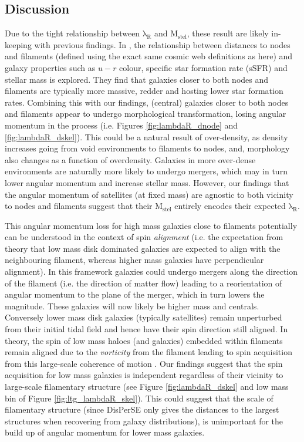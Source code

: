 \subsection{Discussion}
Due to the tight relationship between $\mathrm{\lambda_R}$ and $\mathrm{M_{stel}}$, these result are likely in-keeping with previous findings. In \citet{kraljic2018}, the relationship between distances to nodes and filaments (defined using the exact same cosmic web definitions as here) and galaxy properties such as $u - r$ colour, specific star formation rate (sSFR) and stellar mass is explored. They find that galaxies closer to both nodes and filaments are typically more massive, redder and hosting lower star formation rates. Combining this with our findings, (central) galaxies closer to both nodes and filaments appear to undergo morphological transformation, losing angular momentum in the process (i.e. Figures \ref{fig:lambdaR_dnode} and \ref{fig:lambdaR_dskel}). This could be a natural result of over-density, as density increases going from void environments to filaments to nodes, and, morphology also changes as a function of overdensity. Galaxies in more over-dense environments are naturally more likely to undergo mergers, which may in turn lower angular momentum and increase stellar mass. However, our findings that the angular momentum of satellites (at fixed mass) are agnostic to both vicinity to nodes and filaments suggest that their $\mathrm{M_{stel}}$ entirely encodes their expected $\mathrm{\lambda_R}$. 

This angular momentum loss for high mass galaxies close to filaments potentially can be understood in the context of spin \textit{alignment} (i.e. the expectation from theory that low mass disk dominated galaxies are expected to align with the neighbouring filament, whereas higher mass galaxies have perpendicular alignment). In this framework galaxies could undergo mergers along the direction of the filament (i.e. the direction of matter flow) leading to a reorientation of angular momentum to the plane of the merger, which in turn lowers the magnitude. These galaxies will now likely be higher mass and centrals. Conversely lower mass disk galaxies (typically satellites) remain unperturbed from their initial tidal field and hence have their spin direction still aligned. In theory, the spin of low mass haloes (and galaxies) embedded within filaments remain aligned due to the \textit{vorticity} from the filament leading to spin acquisition from this large-scale coherence of motion \citep[e.g.][]{pichon2011,laigle2015, codis2015}. Our findings suggest that the spin acquisition for low mass galaxies is independent regardless of their vicinity to large-scale filamentary structure (see Figure \ref{fig:lambdaR_dskel} and low mass bin of Figure \ref{fig:ltg_lambdaR_skel}). This could suggest that the scale of filamentary structure (since DisPerSE only gives the distances to the largest structures when recovering from galaxy distributions), is unimportant for the build up of angular momentum for lower mass galaxies.

